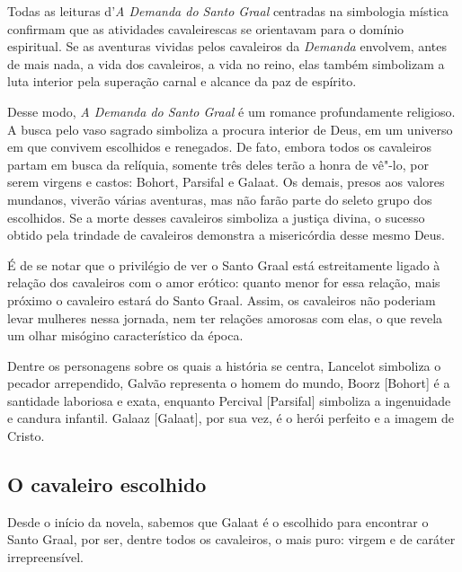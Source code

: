\documentclass[11pt]{extarticle}
\begin{document}
Todas as leituras d'\emph{A Demanda do Santo
Graal} centradas na simbologia mística confirmam que as atividades
cavaleirescas se orientavam para o domínio espiritual. Se as aventuras
vividas pelos cavaleiros da \emph{Demanda} envolvem, antes de mais nada,
a vida dos cavaleiros, a vida no reino, elas também simbolizam a luta
interior pela superação carnal e alcance da paz de
espírito.




Desse modo, \emph{A Demanda do Santo Graal} é
um romance profundamente religioso. A busca pelo vaso sagrado simboliza
a procura interior de Deus, em um universo em que convivem escolhidos e
renegados. De fato, embora todos os cavaleiros partam em busca da
relíquia, somente três deles terão a honra de vê"-lo, por serem virgens e
castos: Bohort, Parsifal e Galaat. Os demais, presos aos valores
mundanos, viverão várias aventuras, mas não farão parte do seleto grupo
dos escolhidos. Se a morte desses cavaleiros simboliza a justiça divina,
o sucesso obtido pela trindade de cavaleiros demonstra a misericórdia
desse mesmo Deus.




É de se notar que o privilégio de ver o Santo Graal está
estreitamente ligado à relação dos cavaleiros com o amor erótico: quanto
menor for essa relação, mais próximo o cavaleiro estará do Santo Graal.
Assim, os cavaleiros não poderiam levar mulheres nessa jornada, nem ter
relações amorosas com elas, o que revela um olhar misógino
característico da época.

Dentre os personagens sobre os quais a história se centra,
Lancelot simboliza o pecador arrependido, Galvão representa o homem do
mundo, Boorz {[}Bohort{]} é a santidade laboriosa e exata, enquanto
Percival {[}Parsifal{]} simboliza a ingenuidade e candura infantil.
Galaaz {[}Galaat{]}, por sua vez, é o herói perfeito e a imagem de
Cristo.

\subsection{O cavaleiro escolhido}

Desde o início da novela, sabemos que Galaat é o escolhido para
encontrar o Santo Graal, por ser, dentre todos os cavaleiros, o mais
puro: virgem e de caráter
irrepreensível.
\end{document}
